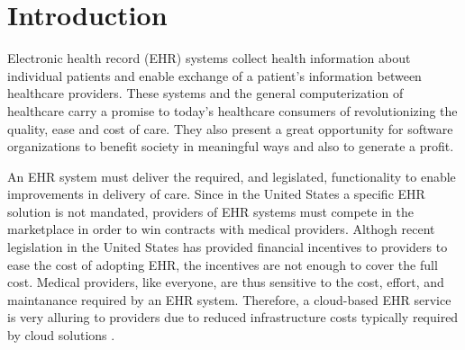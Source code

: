 \documentclass[10pt]{article}
\begin{document}





\section{Introduction}
\label{sec:Introduction}

Electronic health record (EHR) systems collect health information about individual patients 
and enable exchange of a patient's information between healthcare providers.
These systems and the general computerization of healthcare carry a promise to today's healthcare consumers
of revolutionizing the quality, ease and cost of care.
They also present a great opportunity for software organizations to benefit society in meaningful ways
and also to generate a profit.

An EHR system must deliver the required, and legislated, functionality to enable improvements in delivery of care.
Since in the United States a specific EHR solution is not mandated, providers of EHR systems must compete in the marketplace
in order to win contracts with medical providers.
Althogh recent legislation in the United States has provided financial incentives to providers to ease the cost of adopting EHR,
the incentives are not enough to cover the full cost.
Medical providers, like everyone, are thus sensitive to the cost, effort, and maintanance required by an EHR system.
Therefore, a cloud-based EHR service is very alluring to providers due to reduced infrastructure costs typically required by cloud solutions \cite{auditingprivacy}.
\end{document}
